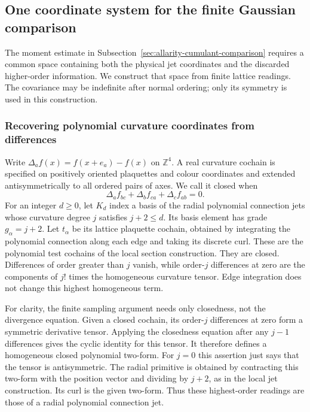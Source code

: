 \subsection{One coordinate system for the finite Gaussian comparison}
\label{sec:allarity-coordinate-calibration}

The moment estimate in Subsection~\ref{sec:allarity-cumulant-comparison}
requires a common space containing both the physical jet coordinates
and the discarded higher-order information. We construct that space
from finite lattice readings. The covariance may be indefinite after
normal ordering; only its symmetry is used in this construction.

\subsubsection{Recovering polynomial curvature coordinates from differences}

Write $\Delta_a f(x)=f(x+e_a)-f(x)$ on $\mathbb Z^4$. A real
curvature cochain is specified on positively oriented plaquettes and
colour coordinates and extended antisymmetrically to all ordered
pairs of axes. We call it closed when
\[
                \Delta_a f_{bc}+\Delta_b f_{ca}
                                  +\Delta_c f_{ab}=0.
\]
For an integer $d\ge0$, let $K_d$ index a basis of the radial
polynomial connection jets whose curvature degree $j$ satisfies
$j+2\le d$. Its basis element has grade $g_\alpha=j+2$.
Let $t_\alpha$ be its lattice plaquette cochain, obtained by
integrating the polynomial connection along each edge and taking its
discrete curl. These are the polynomial test cochains of the local
section construction. They are closed. Differences of order greater
than $j$ vanish, while order-$j$ differences at zero are the
components of $j!$ times the homogeneous curvature tensor. Edge
integration does not change this highest homogeneous term.

For clarity, the finite sampling argument needs only closedness,
not the divergence equation. Given a closed cochain, its order-$j$
differences at zero form a symmetric derivative tensor. Applying
the closedness equation after any $j-1$ differences gives the
cyclic identity for this tensor. It therefore defines a homogeneous
closed polynomial two-form. For $j=0$ this assertion just says that
the tensor is antisymmetric. The radial primitive is obtained by
contracting this two-form with the position vector and dividing by
$j+2$, as in the local jet construction. Its curl is the given
two-form. Thus these highest-order readings are those of a radial
polynomial connection jet.

